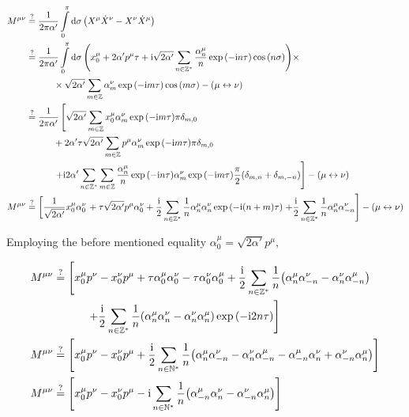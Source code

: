\begin{align*}
    M^{\mu\nu}&\stackrel{?}{=}\frac{1}{2\pi\alpha'}\int\limits_0^\pi\dd{\sigma}\qty(X^\mu{\dot X}^\nu-X^\nu{\dot X}^\mu)\\
    &\stackrel{?}{=}\frac{1}{2\pi\alpha'}\int\limits_0^\pi\dd{\sigma}\qty(x_0^\mu+2\alpha'p^\mu\tau+\textnormal{i}\sqrt{2\alpha'}\sum\limits_{n\in\mathbb Z^\ast}\frac{\alpha^\mu_n}{n}\exp\qty(-\textnormal{i} n\tau)\cos\qty(n\sigma))\times\\
    &\quad\quad\quad\times\sqrt{2\alpha'}\sum\limits_{m\in\mathbb Z}\alpha^\nu_m\exp\qty(-\textnormal{i} m\tau)\cos\qty(m\sigma)-\qty(\mu\leftrightarrow\nu)\\
    &\stackrel{?}{=}\frac{1}{2\pi\alpha'}\left[\sqrt{2\alpha'}\sum\limits_{m\in\mathbb Z}x_0^\mu\alpha^\nu_m\exp\qty(-\textnormal{i} m\tau)\pi\delta_{m,0}\right.\\
    &\quad\quad\quad+2\alpha'\tau\sqrt{2\alpha'}\sum\limits_{m\in\mathbb Z}p^\mu\alpha^\nu_m\exp\qty(-\textnormal{i} m\tau)\pi\delta_{m,0}\\
    &\quad\quad\quad\left.+\textnormal{i} 2\alpha'\sum\limits_{n\in\mathbb Z^\ast}\sum\limits_{m\in\mathbb Z}\frac{\alpha^\mu_n}{n}\exp\qty(-\textnormal{i} n\tau)\alpha^\nu_m\exp\qty(-\textnormal{i} m\tau)\frac\pi2\qty(\delta_{m,n}+\delta_{m,-n})\right]-\qty(\mu\leftrightarrow\nu)\\
    M^{\mu\nu}&\stackrel{?}{=}\left[\frac{1}{\sqrt{2\alpha'}}x_0^\mu\alpha^\nu_0\right.+\tau\sqrt{2\alpha'}p^\mu\alpha^\nu_0+\frac{\textnormal{i}}2 \sum\limits_{n\in\mathbb Z^\ast}\frac{1}{n}\alpha^\mu_n\alpha^\nu_n\exp\qty(-\textnormal{i} \qty(n+m)\tau)\left.+\frac{\textnormal{i}}2\sum\limits_{n\in\mathbb Z^\ast}\frac{1}{n}\alpha^\mu_n\alpha^\nu_{-n}\right]-\qty(\mu\leftrightarrow\nu)
\end{align*}

Employing the before mentioned equality $\alpha^\mu_0=\sqrt{2\alpha'}p^\mu$,

\begin{align*}
    M^{\mu\nu}&\stackrel{?}{=}\left[x_0^\mu p^\nu-x_0^\nu p^\mu+\tau\alpha_0^\mu \alpha_0^\nu-\tau\alpha_0^\nu \alpha_0^\mu+\frac{\textnormal{i}}2\sum\limits_{n\in\mathbb Z^\ast}\frac{1}{n}\qty(\alpha^\mu_n\alpha^\nu_{-n}-\alpha^\nu_n\alpha^\mu_{-n})\right.\\
    &\quad\quad\quad\left.+\frac{\textnormal{i}}2 \sum\limits_{n\in\mathbb Z^\ast}\frac{1}{n}\qty(\alpha^\mu_n\alpha^\nu_n-\alpha^\nu_n\alpha^\mu_n)\exp\qty(-\textnormal{i} 2n\tau)\right]\\
    M^{\mu\nu}&\stackrel{?}{=}\left[x_0^\mu p^\nu-x_0^\nu p^\mu+\frac{\textnormal{i}}2\sum\limits_{n\in\mathbb N^\ast}\frac{1}{n}\qty(\alpha^\mu_n\alpha^\nu_{-n}-\alpha^\nu_n\alpha^\mu_{-n}-\alpha^\mu_{-n}\alpha^\nu_{n}+\alpha^\nu_{-n}\alpha^\mu_{n})\right]\\
    M^{\mu\nu}&\stackrel{?}{=}\left[x_0^\mu p^\nu-x_0^\nu p^\mu-\textnormal{i}\sum\limits_{n\in\mathbb N^\ast}\frac{1}{n}\qty(\alpha^\mu_{-n}\alpha^\nu_{n}-\alpha^\nu_{-n}\alpha^\mu_{n})\right]
\end{align*}

